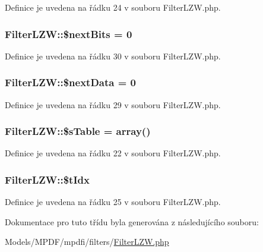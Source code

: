 Definice je uvedena na řádku 24 v souboru Filter\-L\-Z\-W.\-php.

\hypertarget{class_filter_l_z_w_a57ae5d01e13b31e5296f3b55ae21a003}{
\subsubsection[{\$next\-Bits}]{\setlength{\rightskip}{0pt plus 5cm}Filter\-L\-Z\-W\-::\$next\-Bits = 0}}\label{class_filter_l_z_w_a57ae5d01e13b31e5296f3b55ae21a003}


Definice je uvedena na řádku 30 v souboru Filter\-L\-Z\-W.\-php.

\hypertarget{class_filter_l_z_w_aa926bc152d7d6bca1a4ba8aa163362f2}{
\subsubsection[{\$next\-Data}]{\setlength{\rightskip}{0pt plus 5cm}Filter\-L\-Z\-W\-::\$next\-Data = 0}}\label{class_filter_l_z_w_aa926bc152d7d6bca1a4ba8aa163362f2}


Definice je uvedena na řádku 29 v souboru Filter\-L\-Z\-W.\-php.

\hypertarget{class_filter_l_z_w_a94502219ea0cbca1334f1cb7282ad52d}{
\subsubsection[{\$s\-Table}]{\setlength{\rightskip}{0pt plus 5cm}Filter\-L\-Z\-W\-::\$s\-Table = array()}}\label{class_filter_l_z_w_a94502219ea0cbca1334f1cb7282ad52d}


Definice je uvedena na řádku 22 v souboru Filter\-L\-Z\-W.\-php.

\hypertarget{class_filter_l_z_w_ac6b4c616bb8f8e873233f1de77e5d59c}{
\subsubsection[{\$t\-Idx}]{\setlength{\rightskip}{0pt plus 5cm}Filter\-L\-Z\-W\-::\$t\-Idx}}\label{class_filter_l_z_w_ac6b4c616bb8f8e873233f1de77e5d59c}


Definice je uvedena na řádku 25 v souboru Filter\-L\-Z\-W.\-php.



Dokumentace pro tuto třídu byla generována z následujícího souboru\-:\begin{DoxyCompactItemize}
\item 
Models/\-M\-P\-D\-F/mpdfi/filters/\hyperlink{_filter_l_z_w_8php}{Filter\-L\-Z\-W.\-php}\end{DoxyCompactItemize}
